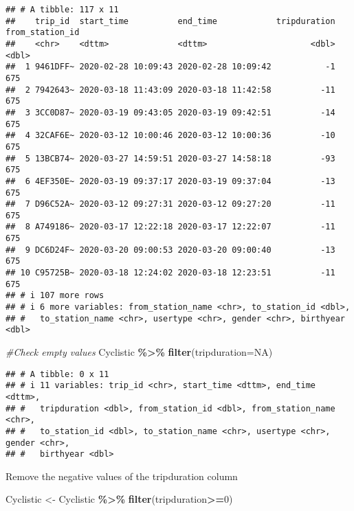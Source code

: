 \documentclass[
]{article}
\newenvironment{Shaded}{\begin{snugshade}}{\end{snugshade}}
\newcommand{\AttributeTok}[1]{\textcolor[rgb]{0.13,0.29,0.53}{#1}}
\newcommand{\CommentTok}[1]{\textcolor[rgb]{0.56,0.35,0.01}{\textit{#1}}}
\newcommand{\ConstantTok}[1]{\textcolor[rgb]{0.56,0.35,0.01}{#1}}
\newcommand{\DecValTok}[1]{\textcolor[rgb]{0.00,0.00,0.81}{#1}}
\newcommand{\FunctionTok}[1]{\textcolor[rgb]{0.13,0.29,0.53}{\textbf{#1}}}
\newcommand{\NormalTok}[1]{#1}
\newcommand{\OtherTok}[1]{\textcolor[rgb]{0.56,0.35,0.01}{#1}}
\newcommand{\SpecialCharTok}[1]{\textcolor[rgb]{0.81,0.36,0.00}{\textbf{#1}}}
\begin{document}
\begin{verbatim}
## # A tibble: 117 x 11
##    trip_id  start_time          end_time            tripduration from_station_id
##    <chr>    <dttm>              <dttm>                     <dbl>           <dbl>
##  1 9461DFF~ 2020-02-28 10:09:43 2020-02-28 10:09:42           -1             675
##  2 7942643~ 2020-03-18 11:43:09 2020-03-18 11:42:58          -11             675
##  3 3CC0D87~ 2020-03-19 09:43:05 2020-03-19 09:42:51          -14             675
##  4 32CAF6E~ 2020-03-12 10:00:46 2020-03-12 10:00:36          -10             675
##  5 13BCB74~ 2020-03-27 14:59:51 2020-03-27 14:58:18          -93             675
##  6 4EF350E~ 2020-03-19 09:37:17 2020-03-19 09:37:04          -13             675
##  7 D96C52A~ 2020-03-12 09:27:31 2020-03-12 09:27:20          -11             675
##  8 A749186~ 2020-03-17 12:22:18 2020-03-17 12:22:07          -11             675
##  9 DC6D24F~ 2020-03-20 09:00:53 2020-03-20 09:00:40          -13             675
## 10 C95725B~ 2020-03-18 12:24:02 2020-03-18 12:23:51          -11             675
## # i 107 more rows
## # i 6 more variables: from_station_name <chr>, to_station_id <dbl>,
## #   to_station_name <chr>, usertype <chr>, gender <chr>, birthyear <dbl>
\end{verbatim}

\begin{Shaded}
\begin{Highlighting}[]
\CommentTok{\#Check empty values}
\NormalTok{Cyclistic }\SpecialCharTok{\%\textgreater{}\%}
  \FunctionTok{filter}\NormalTok{(}\AttributeTok{tripduration=}\ConstantTok{NA}\NormalTok{)}
\end{Highlighting}
\end{Shaded}

\begin{verbatim}
## # A tibble: 0 x 11
## # i 11 variables: trip_id <chr>, start_time <dttm>, end_time <dttm>,
## #   tripduration <dbl>, from_station_id <dbl>, from_station_name <chr>,
## #   to_station_id <dbl>, to_station_name <chr>, usertype <chr>, gender <chr>,
## #   birthyear <dbl>
\end{verbatim}

Remove the negative values of the tripduration column

\begin{Shaded}
\begin{Highlighting}[]
\NormalTok{Cyclistic }\OtherTok{\textless{}{-}}\NormalTok{ Cyclistic }\SpecialCharTok{\%\textgreater{}\%}
  \FunctionTok{filter}\NormalTok{(tripduration}\SpecialCharTok{\textgreater{}=}\DecValTok{0}\NormalTok{)}
\end{Highlighting}
\end{Shaded}
\end{document}

